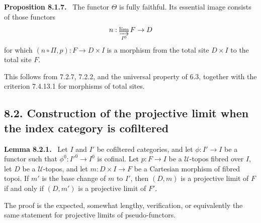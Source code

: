 \documentclass[11pt]{article}
\newcommand{\U}{\mathcal{U}}
\newenvironment{statement}[1]{\par\medskip\noindent\textbf{#1.}\ }{\par\medskip}
\begin{document}
\begin{statement}{Proposition 8.1.7}
The functor \(\Theta\) is fully faithful. Its essential image consists of those functors
\[
 n:\varinjlim_{I^0}F\to D
\]
for which \((n\circ\Pi,p):F\to D\times I\) is a morphism from the total site \(D\times I\) to the total site \(F\).
\end{statement}
This follows from 7.2.7, 7.2.2, and the universal property of 6.3, together with the criterion 7.4.13.1 for morphisms of total sites.

\subsection*{8.2. Construction of the projective limit when the index category is cofiltered}

\begin{statement}{Lemma 8.2.1}
Let \(I\) and \(I'\) be cofiltered categories, and let \(\phi:I'\to I\) be a functor such that \(\phi^0:{I'}^0\to I^0\) is cofinal. Let \(p:F\to I\) be a \(\U\)-topos fibred over \(I\), let \(D\) be a \(\U\)-topos, and let \(m:D\times I\to F\) be a Cartesian morphism of fibred topoi. If \(m'\) is the base change of \(m\) to \(I'\), then \((D,m)\) is a projective limit of \(F\) if and only if \((D,m')\) is a projective limit of \(F'\).
\end{statement}
The proof is the expected, somewhat lengthy, verification, or equivalently the same statement for projective limits of pseudo-functors.
\end{document}
